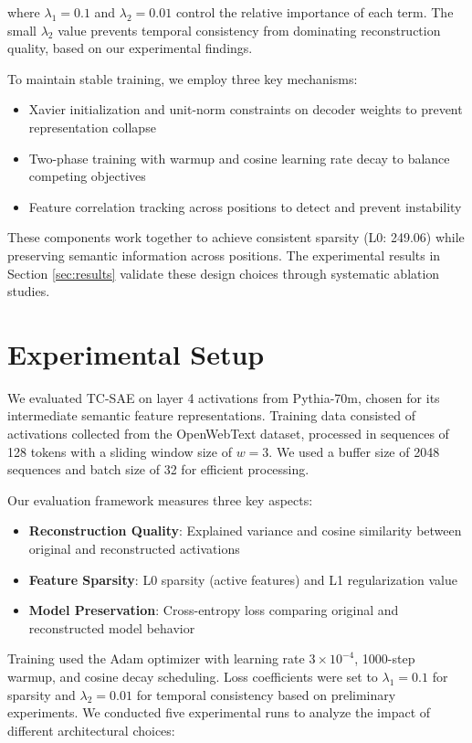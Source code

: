 \documentclass{article} %
\begin{document}
where $\lambda_1=0.1$ and $\lambda_2=0.01$ control the relative importance of each term. The small $\lambda_2$ value prevents temporal consistency from dominating reconstruction quality, based on our experimental findings.

To maintain stable training, we employ three key mechanisms:
\begin{itemize}
    \item Xavier initialization and unit-norm constraints on decoder weights to prevent representation collapse
    \item Two-phase training with warmup and cosine learning rate decay to balance competing objectives
    \item Feature correlation tracking across positions to detect and prevent instability
\end{itemize}

These components work together to achieve consistent sparsity (L0: 249.06) while preserving semantic information across positions. The experimental results in Section \ref{sec:results} validate these design choices through systematic ablation studies.

\section{Experimental Setup}
\label{sec:experimental}

We evaluated TC-SAE on layer 4 activations from Pythia-70m, chosen for its intermediate semantic feature representations. Training data consisted of activations collected from the OpenWebText dataset, processed in sequences of 128 tokens with a sliding window size of $w=3$. We used a buffer size of 2048 sequences and batch size of 32 for efficient processing.

Our evaluation framework measures three key aspects:
\begin{itemize}
    \item \textbf{Reconstruction Quality}: Explained variance and cosine similarity between original and reconstructed activations
    \item \textbf{Feature Sparsity}: L0 sparsity (active features) and L1 regularization value
    \item \textbf{Model Preservation}: Cross-entropy loss comparing original and reconstructed model behavior
\end{itemize}

Training used the Adam optimizer with learning rate $3\times10^{-4}$, 1000-step warmup, and cosine decay scheduling. Loss coefficients were set to $\lambda_1=0.1$ for sparsity and $\lambda_2=0.01$ for temporal consistency based on preliminary experiments. We conducted five experimental runs to analyze the impact of different architectural choices:
\end{document}
